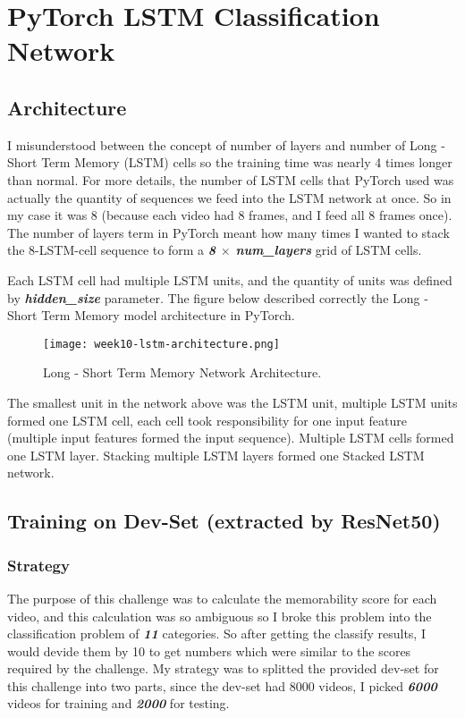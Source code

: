 \section{PyTorch LSTM Classification Network}
\subsection{Architecture}
I misunderstood between the concept of number of layers and number of Long - Short Term Memory (LSTM) cells so the training time was nearly 4 times longer than normal. For more details, the number of LSTM cells that PyTorch used was actually the quantity of sequences we feed into the LSTM network at once. So in my case it was 8 (because each video had 8 frames, and I feed all 8 frames once). The number of layers term in PyTorch meant how many times I wanted to stack the 8-LSTM-cell sequence to form a  \textbf{\emph{8 \( \times \) num\_layers}} grid of LSTM cells.

Each LSTM cell had multiple LSTM units, and the quantity of units was defined by \textbf{\emph{hidden\_size}} parameter. The figure below described correctly the Long - Short Term Memory model architecture in PyTorch.

\begin{figure}[!ht]
\centering
\texttt{[image: week10-lstm-architecture.png]}
\caption{Long - Short Term Memory Network Architecture.}
\end{figure}

The smallest unit in the network above was the LSTM unit, multiple LSTM units formed one LSTM cell, each cell took responsibility for one input feature (multiple input features formed the input sequence). Multiple LSTM cells formed one LSTM layer. Stacking multiple LSTM layers formed one Stacked LSTM network.

\subsection{Training on Dev-Set (extracted by ResNet50)}
\subsubsection{Strategy}
The purpose of this challenge was to calculate the memorability score for each video, and this calculation was so ambiguous so I broke this problem into the classification problem of \textbf{\emph{11}} categories. So after getting the classify results, I would devide them by 10 to get numbers which were similar to the scores required by the challenge. My strategy was to splitted the provided dev-set for this challenge into two parts, since the dev-set had 8000 videos, I picked \textbf{\emph{6000}} videos for training and \textbf{\emph{2000}} for testing.

